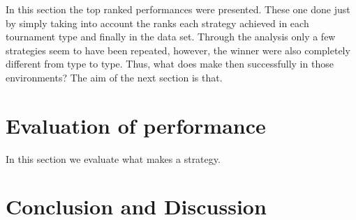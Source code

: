 \documentclass{article}
\begin{document}
In this section the top ranked performances were presented. These one done
just by simply taking into account the ranks each strategy achieved in each
tournament type and finally in the data set. Through the analysis only a few
strategies seem to have been repeated, however, the winner were also
completely different from type to type. Thus, what does make then successfully
in those environments? The aim of the next section is that.

\section{Evaluation of performance}\label{section:evaluation_of_performance}

In this section we evaluate what makes a strategy.



\section{Conclusion and Discussion}\label{section:conclusion}



\end{document}
